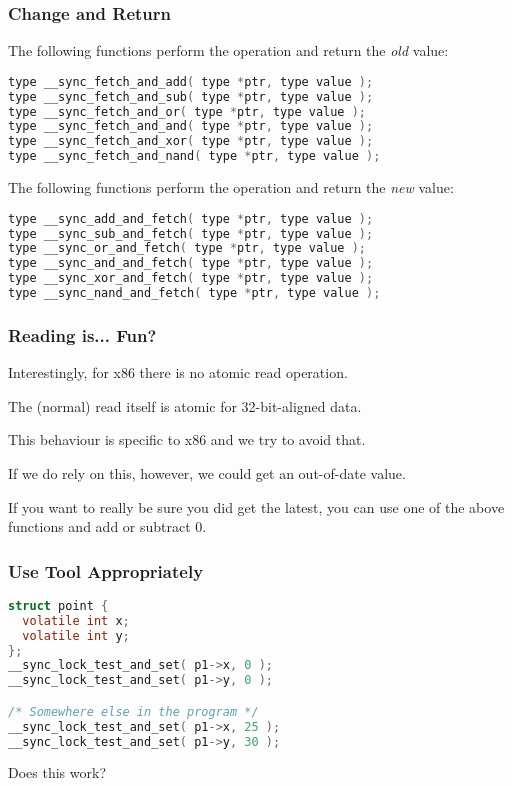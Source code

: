 \begin{frame}[fragile]
\frametitle{Change and Return}

The following functions perform the operation and return the \textit{old} value:
\begin{lstlisting}[language=C]
type __sync_fetch_and_add( type *ptr, type value );
type __sync_fetch_and_sub( type *ptr, type value );
type __sync_fetch_and_or( type *ptr, type value );
type __sync_fetch_and_and( type *ptr, type value );
type __sync_fetch_and_xor( type *ptr, type value );
type __sync_fetch_and_nand( type *ptr, type value );
\end{lstlisting}

The following functions perform the operation and return the \textit{new} value:
\begin{lstlisting}[language=C]
type __sync_add_and_fetch( type *ptr, type value );
type __sync_sub_and_fetch( type *ptr, type value );
type __sync_or_and_fetch( type *ptr, type value );
type __sync_and_and_fetch( type *ptr, type value );
type __sync_xor_and_fetch( type *ptr, type value );
type __sync_nand_and_fetch( type *ptr, type value );
\end{lstlisting}


\end{frame}


\begin{frame}
\frametitle{Reading is... Fun?}

Interestingly, for x86 there is no atomic read operation. 

The (normal) read itself is atomic for 32-bit-aligned data. 

This behaviour is specific to x86 and we try to avoid that.

If we do rely on this, however, we could get an out-of-date value. 

If you want to really be sure you did get the latest, you can use one of the above functions and add or subtract 0.


\end{frame}



\begin{frame}[fragile]
	\frametitle{Use Tool Appropriately}

	\begin{lstlisting}[language=C]
struct point {
  volatile int x;
  volatile int y;
};
__sync_lock_test_and_set( p1->x, 0 );
__sync_lock_test_and_set( p1->y, 0 );

/* Somewhere else in the program */
__sync_lock_test_and_set( p1->x, 25 );
__sync_lock_test_and_set( p1->y, 30 );
\end{lstlisting}

	Does this work?

\end{frame}


